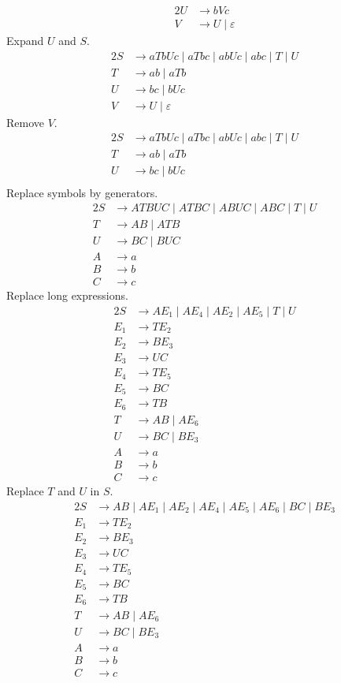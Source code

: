 {\begin{alignat*}{2}
	U &\rightarrow bVc\\
	V &\rightarrow U\mid \varepsilon
\end{alignat*}
Expand $U$ and $S$.
\begin{alignat*}{2}
	S &\rightarrow aTbUc\mid aTbc\mid abUc\mid abc\mid T\mid U\\
	T &\rightarrow ab\mid aTb\\
	U &\rightarrow bc\mid bUc\\
	V &\rightarrow U\mid \varepsilon
\end{alignat*}
Remove $V$.
\begin{alignat*}{2}
	S &\rightarrow aTbUc\mid aTbc\mid abUc\mid abc\mid T\mid U\\
	T &\rightarrow ab\mid aTb\\
	U &\rightarrow bc\mid bUc\\
\end{alignat*}
Replace symbols by generators.
\begin{alignat*}{2}
	S &\rightarrow ATBUC\mid ATBC\mid ABUC\mid ABC\mid T\mid U\\
	T &\rightarrow AB\mid ATB\\
	U &\rightarrow BC\mid BUC\\
	A &\rightarrow a\\
	B &\rightarrow b\\
	C &\rightarrow c
\end{alignat*}
Replace long expressions.
\begin{alignat*}{2}
	S   &\rightarrow AE_1\mid AE_4\mid AE_2\mid AE_5\mid T\mid U\\
	E_1 &\rightarrow TE_2\\
	E_2 &\rightarrow BE_3\\
	E_3 &\rightarrow UC\\
	E_4 &\rightarrow TE_5\\
	E_5 &\rightarrow BC\\
	E_6 &\rightarrow TB\\
	T   &\rightarrow AB\mid AE_6\\
	U   &\rightarrow BC\mid BE_3\\
	A   &\rightarrow a\\
	B   &\rightarrow b\\
	C   &\rightarrow c
\end{alignat*}
Replace $T$ and $U$ in $S$.
\begin{alignat*}{2}
	S   &\rightarrow AB\mid AE_1\mid AE_2\mid AE_4\mid AE_5\mid AE_6\mid BC\mid BE_3\\
	E_1 &\rightarrow TE_2\\
	E_2 &\rightarrow BE_3\\
	E_3 &\rightarrow UC\\
	E_4 &\rightarrow TE_5\\
	E_5 &\rightarrow BC\\
	E_6 &\rightarrow TB\\
	T   &\rightarrow AB\mid AE_6\\
	U   &\rightarrow BC\mid BE_3\\
	A   &\rightarrow a\\
	B   &\rightarrow b\\
	C   &\rightarrow c
\end{alignat*}
}
